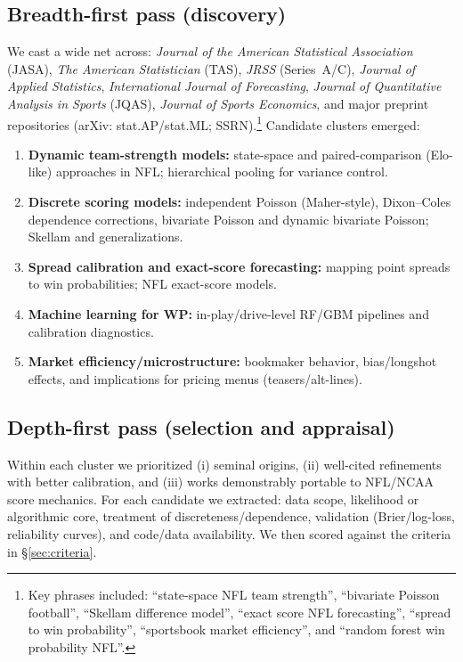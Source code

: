 \documentclass[11pt]{amsart}
\begin{document}
\subsection*{Breadth-first pass (discovery)}
We cast a wide net across: \emph{Journal of the American Statistical Association} (JASA), \emph{The American Statistician} (TAS), \emph{JRSS} (Series~A/C), \emph{Journal of Applied Statistics}, \emph{International Journal of Forecasting}, \emph{Journal of Quantitative Analysis in Sports} (JQAS), \emph{Journal of Sports Economics}, and major preprint repositories (arXiv: stat.AP/stat.ML; SSRN).\footnote{Key phrases included: ``state-space NFL team strength'', ``bivariate Poisson football'', ``Skellam difference model'', ``exact score NFL forecasting'', ``spread to win probability'', ``sportsbook market efficiency'', and ``random forest win probability NFL''.} Candidate clusters emerged:
\begin{enumerate}[leftmargin=2em]
\item \textbf{Dynamic team-strength models:} state-space and paired-comparison (Elo-like) approaches in NFL; hierarchical pooling for variance control.
\item \textbf{Discrete scoring models:} independent Poisson (Maher-style), Dixon--Coles dependence corrections, bivariate Poisson and dynamic bivariate Poisson; Skellam and generalizations.
\item \textbf{Spread calibration and exact-score forecasting:} mapping point spreads to win probabilities; NFL exact-score models.
\item \textbf{Machine learning for WP:} in-play/drive-level RF/GBM pipelines and calibration diagnostics.
\item \textbf{Market efficiency/microstructure:} bookmaker behavior, bias/longshot effects, and implications for pricing menus (teasers/alt-lines).
\end{enumerate}

\subsection*{Depth-first pass (selection and appraisal)}
Within each cluster we prioritized (i) seminal origins, (ii) well-cited refinements with better calibration, and (iii) works demonstrably portable to NFL/NCAA score mechanics. For each candidate we extracted: data scope, likelihood or algorithmic core, treatment of discreteness/dependence, validation (Brier/log-loss, reliability curves), and code/data availability. We then scored against the criteria in \S\ref{sec:criteria}.
\end{document}
